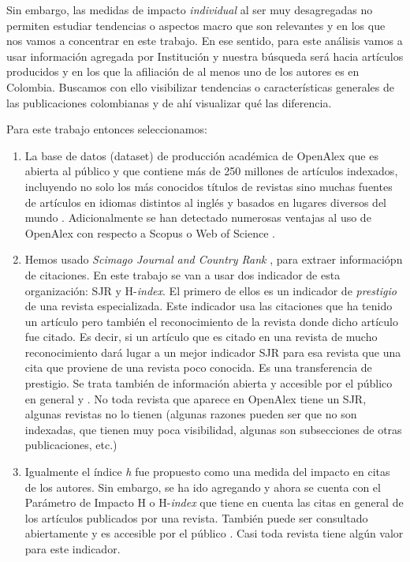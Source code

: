 \documentclass[
11pt, %
letter, %
oneside, %
]{article} %
\begin{document}
Sin embargo, las medidas de impacto \textit{individual} al ser muy desagregadas no permiten estudiar tendencias o aspectos macro que son relevantes y en los que nos vamos a concentrar en este trabajo. En ese sentido, para este análisis vamos a usar información agregada por Institución y nuestra búsqueda será hacia artículos producidos y en los que la afiliación de al menos uno de los autores es en Colombia. Buscamos con ello visibilizar tendencias o características generales de las publicaciones colombianas y de ahí visualizar qué las diferencia.

Para este trabajo entonces seleccionamos:

\begin{enumerate}
	\item La base de datos (dataset) de producción académica de OpenAlex que es abierta al público y que contiene más de 250 millones de artículos indexados, incluyendo no solo los más conocidos títulos de revistas sino muchas fuentes de artículos en idiomas distintos al inglés y basados en lugares diversos del mundo \cite{OpenAlex}. Adicionalmente se han detectado numerosas ventajas al uso de OpenAlex con respecto a Scopus o Web of Science \cite{culbert}.
	\item Hemos usado \textit{Scimago Journal and Country Rank} \cite{scimago}, para extraer informaciópn de citaciones. En este trabajo se van a usar dos indicador de esta organización: SJR y H-\textit{index}. El primero de ellos es un indicador de \textit{prestigio} de una revista especializada. Este indicador usa las citaciones que ha tenido un artículo pero también el reconocimiento de la revista donde dicho artículo fue citado. Es decir, si un artículo que es citado en una revista de mucho reconocimiento dará lugar a un mejor indicador SJR para esa revista que una cita que proviene de una revista poco conocida. Es una transferencia de prestigio. Se trata también de información abierta y accesible por el público en general \cite{daemen} y \cite{maryland}. No toda revista que aparece en OpenAlex tiene un SJR, algunas revistas no lo tienen (algunas razones pueden ser que no son indexadas, que tienen muy poca visibilidad, algunas son subsecciones de otras publicaciones, etc.)
	\item Igualmente el índice \textit{h} fue propuesto como una medida del impacto en citas de los autores. Sin embargo, se ha ido agregando y ahora se cuenta con el Parámetro de Impacto H o H-\textit{index} que tiene en cuenta las citas en general de los artículos publicados por una revista. También puede ser consultado abiertamente y es accesible por el público \cite{western}. Casi toda revista tiene algún valor para este indicador.  
\end{enumerate}
\end{document}
